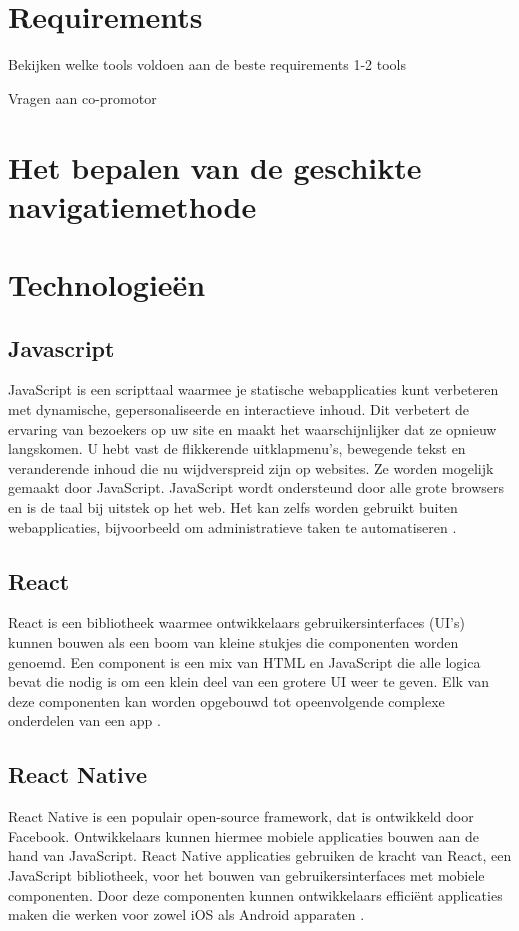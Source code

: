 \section{Requirements}
\label{sec:requirements}
Bekijken welke tools voldoen aan de beste requirements 1-2 tools

Vragen aan co-promotor
\section{Het bepalen van de geschikte navigatiemethode}
\label{sec:het bepalen van de geschikte navigatiemethode}
\section{Technologieën}
\label{sec:technologieën}
\subsection{Javascript}
\label{sec:javascript}
JavaScript is een scripttaal waarmee je statische webapplicaties kunt verbeteren met
dynamische, gepersonaliseerde en interactieve inhoud. Dit verbetert de ervaring van bezoekers op uw site en
maakt het waarschijnlijker dat ze opnieuw langskomen. U hebt vast de flikkerende uitklapmenu's, bewegende
tekst en veranderende inhoud die nu wijdverspreid zijn op websites. Ze worden mogelijk gemaakt door JavaScript. JavaScript wordt ondersteund door alle grote browsers en is de taal bij uitstek op het web. Het kan zelfs worden gebruikt buiten webapplicaties, bijvoorbeeld om administratieve taken te automatiseren \autocite{Wilton2004}.
\subsection{React}
\label{sec:react}
React is een bibliotheek waarmee ontwikkelaars gebruikersinterfaces (UI's) kunnen bouwen als een boom van kleine stukjes die componenten worden genoemd. Een component is een mix van HTML en JavaScript die alle logica bevat die nodig is om een klein deel van een grotere UI weer te geven. Elk van deze componenten kan worden opgebouwd tot opeenvolgende complexe onderdelen van een app \autocite{Baer2018}.
\subsection{React Native}
\label{sec:react native}
React Native is een populair open-source framework, dat is ontwikkeld door Facebook. Ontwikkelaars kunnen hiermee mobiele applicaties bouwen aan de hand van JavaScript. React Native applicaties gebruiken de kracht van React, een JavaScript bibliotheek, voor het bouwen van gebruikersinterfaces met mobiele componenten. Door deze componenten kunnen ontwikkelaars efficiënt applicaties maken die werken voor zowel iOS als Android apparaten \autocite{Vinnik2021}.